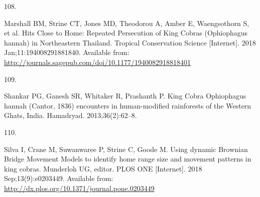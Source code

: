 \documentclass[10pt,a4paper]{article}
\newlength{\cslhangindent}
\newlength{\csllabelwidth}
\newlength{\cslentryspacingunit} %
\newenvironment{CSLReferences}[2] %
 {%
  \setlength{\parindent}{0pt}
  \ifodd #1
  \let\oldpar\par
  \def\par{\hangindent=\cslhangindent\oldpar}
  \fi
  \setlength{\parskip}{#2\cslentryspacingunit}
 }%
 {}
\newcommand{\CSLLeftMargin}[1]{\parbox[t]{\csllabelwidth}{#1}}
\newcommand{\CSLRightInline}[1]{\parbox[t]{\linewidth - \csllabelwidth}{#1}\break}
\begin{document}
\begin{CSLReferences}{0}{0}
\leavevmode{}%
\CSLLeftMargin{108. }
\CSLRightInline{Marshall BM, Strine CT, Jones MD, Theodorou A, Amber E, Waengsothorn S, et al. Hits {Close} to {Home}: {Repeated} {Persecution} of {King} {Cobras} ({Ophiophagus} hannah) in {Northeastern} {Thailand}. Tropical Conservation Science {[}Internet{]}. 2018 Jan;11:194008291881840. Available from: \url{http://journals.sagepub.com/doi/10.1177/1940082918818401}}

\leavevmode{}%
\CSLLeftMargin{109. }
\CSLRightInline{Shankar PG, Ganesh SR, Whitaker R, Prashanth P. King {Cobra} {Ophiophagus} hannah ({Cantor}, 1836) encounters in human-modified rainforests of the {Western} {Ghats}, {India}. Hamadryad. 2013;36(2):62--8. }

\leavevmode{}%
\CSLLeftMargin{110. }
\CSLRightInline{Silva I, Crane M, Suwanwaree P, Strine C, Goode M. Using dynamic {Brownian} {Bridge} {Movement} {Models} to identify home range size and movement patterns in king cobras. Munderloh UG, editor. PLOS ONE {[}Internet{]}. 2018 Sep;13(9):e0203449. Available from: \url{http://dx.plos.org/10.1371/journal.pone.0203449}}

\end{CSLReferences}
\end{document}
